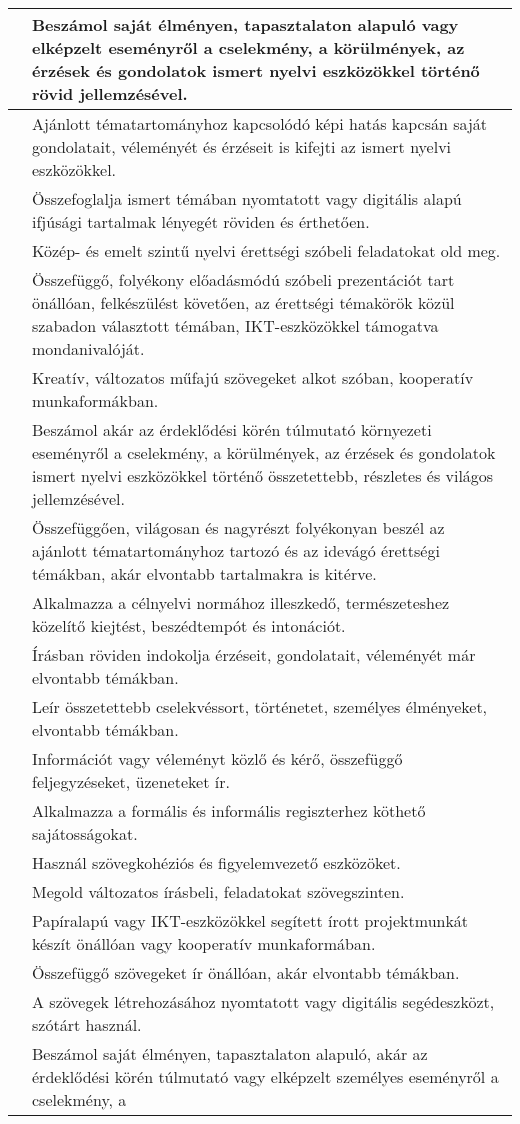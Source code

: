 \begin{longtable}[]{p{\evflength}@{\strut}>{\begin{minipage}{\columnlength}\strut}l<{\strut\end{minipage}}}
\tabularnewline
\hline
&
  Beszámol saját élményen, tapasztalaton alapuló vagy elképzelt
  eseményről a cselekmény, a körülmények, az érzések és gondolatok
  ismert nyelvi eszközökkel történő rövid jellemzésével.
\tabularnewline
\hline
&
  Ajánlott tématartományhoz kapcsolódó képi hatás kapcsán saját
  gondolatait, véleményét és érzéseit is kifejti az ismert nyelvi
  eszközökkel.
\tabularnewline
\hline
&
  Összefoglalja ismert témában nyomtatott vagy digitális alapú ifjúsági
  tartalmak lényegét röviden és érthetően.
\tabularnewline
\hline
&
  Közép- és emelt szintű nyelvi érettségi szóbeli feladatokat old meg.
\tabularnewline
\hline
&
  Összefüggő, folyékony előadásmódú szóbeli prezentációt tart önállóan,
  felkészülést követően, az érettségi témakörök közül szabadon
  választott témában, IKT-eszközökkel támogatva mondanivalóját.
\tabularnewline
\hline
&
  Kreatív, változatos műfajú szövegeket alkot szóban, kooperatív
  munkaformákban.
\tabularnewline
\hline
&
  Beszámol akár az érdeklődési körén túlmutató környezeti eseményről a
  cselekmény, a körülmények, az érzések és gondolatok ismert nyelvi
  eszközökkel történő összetettebb, részletes és világos jellemzésével.
\tabularnewline
\hline
&
  Összefüggően, világosan és nagyrészt folyékonyan beszél az ajánlott
  tématartományhoz tartozó és az idevágó érettségi témákban, akár
  elvontabb tartalmakra is kitérve.
\tabularnewline
\hline
&
  Alkalmazza a célnyelvi normához illeszkedő, természeteshez közelítő
  kiejtést, beszédtempót és intonációt.
\tabularnewline
\hline
&
  Írásban röviden indokolja érzéseit, gondolatait, véleményét már
  elvontabb témákban.
\tabularnewline
\hline
&
  Leír összetettebb cselekvéssort, történetet, személyes élményeket,
  elvontabb témákban.
\tabularnewline
\hline
&
  Információt vagy véleményt közlő és kérő, összefüggő feljegyzéseket,
  üzeneteket ír.
\tabularnewline
\hline
&
  Alkalmazza a formális és informális regiszterhez köthető
  sajátosságokat.
\tabularnewline
\hline
&
  Használ szövegkohéziós és figyelemvezető eszközöket.
\tabularnewline
\hline
&
  Megold változatos írásbeli, feladatokat szövegszinten.
\tabularnewline
\hline
&
  Papíralapú vagy IKT-eszközökkel segített írott projektmunkát készít
  önállóan vagy kooperatív munkaformában.
\tabularnewline
\hline
&
  Összefüggő szövegeket ír önállóan, akár elvontabb témákban.
\tabularnewline
\hline
&
  A szövegek létrehozásához nyomtatott vagy digitális segédeszközt,
  szótárt használ.
\tabularnewline
\hline
&
  Beszámol saját élményen, tapasztalaton alapuló, akár az érdeklődési
  körén túlmutató vagy elképzelt személyes eseményről a cselekmény, a

\end{longtable}
